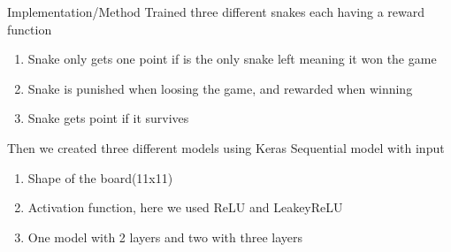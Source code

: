 \documentclass[final]{beamer}
\newlength{\onecolwid}
\newlength{\twocolwid}
\begin{document}
\begin{frame}[t]
\begin{columns}[t]
\begin{column}{\twocolwid}
\begin{columns}[t,totalwidth=\twocolwid]
\begin{column}{\onecolwid}
\begin{block}{Implementation/Method}
Trained three different snakes each having a reward function

\begin{enumerate}
\item Snake only gets one point if is the only snake left meaning it won the game 					
\item Snake is punished when loosing the game, and rewarded when winning
\item Snake gets point if it survives
\end{enumerate}

Then we created three different models using Keras Sequential model with input
 \begin{enumerate}
\item Shape of the board(11x11) 					
\item Activation function, here we used ReLU and LeakeyReLU
\item One model with 2 layers and two with three layers
\end{enumerate}

\end{block}


\end{column} %

\end{columns} %






\begin{columns}[t,totalwidth=\twocolwid] %

\begin{column}{\onecolwid} %


\end{column}
\end{columns}
\end{column}
\end{columns}
\end{frame}
\end{document}
